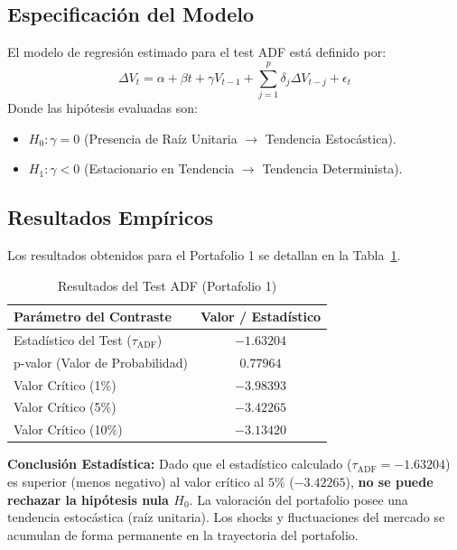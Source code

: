 \documentclass[11pt,a4paper]{article}
\begin{document}
\subsection{Especificación del Modelo}
El modelo de regresión estimado para el test ADF está definido por:
\begin{equation}
    \Delta V_t = \alpha + \beta t + \gamma V_{t-1} + \sum_{j=1}^{p} \delta_j \Delta V_{t-j} + \epsilon_t
\end{equation}
Donde las hipótesis evaluadas son:
\begin{itemize}
    \item $H_0: \gamma = 0$ (Presencia de Raíz Unitaria $\rightarrow$ Tendencia Estocástica).
    \item $H_1: \gamma < 0$ (Estacionario en Tendencia $\rightarrow$ Tendencia Determinista).
\end{itemize}

\subsection{Resultados Empíricos}
Los resultados obtenidos para el Portafolio 1 se detallan en la Tabla~\ref{tab:adf}.

\begin{table}[h]
\centering
\caption{Resultados del Test ADF (Portafolio 1)}
\label{tab:adf}
\vspace{0.2cm}
\begin{tabular}{lc}
\toprule
\textbf{Parámetro del Contraste} & \textbf{Valor / Estadístico} \\
\midrule
Estadístico del Test ($\tau_{\text{ADF}}$) & $-1.63204$ \\
p-valor (Valor de Probabilidad) & $0.77964$ \\
Valor Crítico (1\%) & $-3.98393$ \\
Valor Crítico (5\%) & $-3.42265$ \\
Valor Crítico (10\%) & $-3.13420$ \\
\bottomrule
\end{tabular}
\end{table}

\textbf{Conclusión Estadística:} Dado que el estadístico calculado ($\tau_{\text{ADF}} = -1.63204$) es superior (menos negativo) al valor crítico al $5\%$ ($-3.42265$), \textbf{no se puede rechazar la hipótesis nula $H_0$}. La valoración del portafolio posee una tendencia estocástica (raíz unitaria). Los shocks y fluctuaciones del mercado se acumulan de forma permanente en la trayectoria del portafolio.
\end{document}
